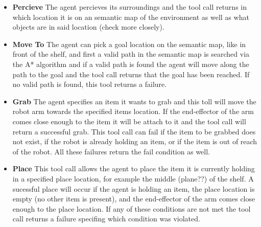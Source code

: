 \documentclass[../report.tex]{subfiles}
\begin{document}
\begin{itemize}
	\item \textbf{Percieve} The agent percieves its surroundings and the tool call returns in which location it is on an semantic map of the environment as well as what objects are in said location (check more closely).
	\item \textbf{Move To} The agent can pick a goal location on the semantic map, like in front of the shelf, and first a valid path in the semantic map is searched via the A* algorithm and if a valid path is found the agent
	      will move along the path to the goal and the tool call returns that the goal has been reached. If no valid path is found, this tool returns a failure.
	\item \textbf{Grab} The agent specifies an item it wants to grab and this toll will move the robot arm towards the specified items location. If the end-effector of the arm comes close enough to the item it will be attach to it and
	      the tool call will return a successful grab. This tool call can fail if the item to be grabbed does not exist, if the robot is already holding an item, or if the item is out of reach of the robot. All these failures return the fail condition as well.
	\item \textbf{Place} This tool call allows the agent to place the item it is currently holding in a specified place location, for example the middle (plane??) of the shelf. A sucessful place will occur if the agent is holding an item,
	      the place location is empty (no other item is present), and the end-effector of the arm comes close enough to the place location. If any of these conditions are not met the tool call returns a failure specifing which condition was violated.
\end{itemize}
\end{document}
